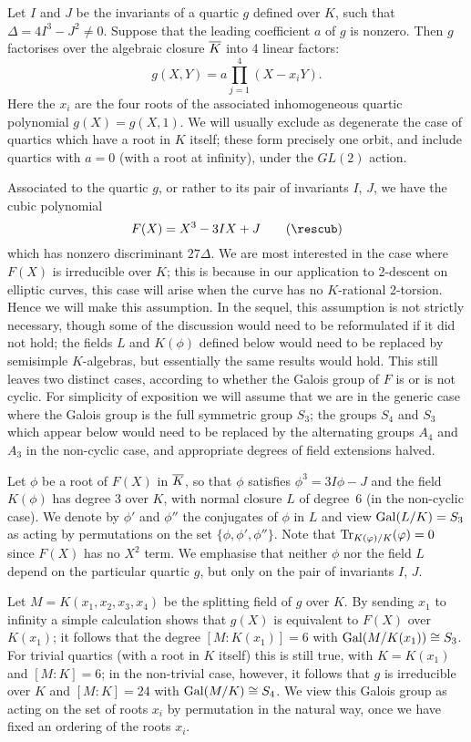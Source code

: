 Let $I$ and $J$ be the invariants of a quartic $g$ defined over
$K$, such that $\Delta=4I^3-J^2\not=0$.  Suppose that the leading
coefficient $a$ of $g$ is nonzero.  Then $g$ factorises over the
algebraic closure $\overline{K}$ into 4 linear factors:
$$
   g(X,Y) = a \prod_{j=1}^{4} (X-x_iY).
$$
Here the $x_i$ are the four roots of the associated inhomogeneous
quartic polynomial $g(X)=g(X,1)$.   We will usually exclude as
degenerate the case of quartics which have a root in $K$ itself; these
form precisely one orbit, and include quartics with $a=0$ (with a root
at infinity), under the $GL(2)$ action.

Associated to the quartic $g$, or rather to its pair of invariants
$I$, $J$, we have the cubic polynomial \neweq\rescub
$$
  F(X) = X^3 - 3IX + J \tag\rescub
$$
which has nonzero discriminant $27\Delta$.  We are most interested in
the case where $F(X)$ is irreducible over $K$; this is because in our
application to 2-descent on elliptic curves, this case will arise when
the curve has no $K$-rational 2-torsion.  Hence we will make this
assumption.  In the sequel, this assumption is not strictly necessary,
though some of the discussion would need to be reformulated if it did
not hold; the fields $L$ and $K(\phi)$ defined below would need to be
replaced by semisimple $K$-algebras, but essentially the same results
would hold.  This still leaves two distinct cases, according to
whether the Galois group of $F$ is or is not cyclic.  For simplicity
of exposition we will assume that we are in the generic case where the
Galois group is the full symmetric group $S_3$; the groups $S_4$ and
$S_3$ which appear below would need to be replaced by the alternating
groups $A_4$ and $A_3$ in the non-cyclic case, and appropriate degrees
of field extensions halved.

Let $\phi$ be a root of $F(X)$ in $\overline{K}$, so that $\phi$ satisfies
$\phi^3=3I\phi-J$ and the field $K(\phi)$ has degree 3 over $K$, with
normal closure $L$ of degree~6 (in the non-cyclic case).  We denote by
$\phi'$ and $\phi''$ the conjugates of $\phi$ in $L$ and view
$\operatorname{Gal}(L/K)=S_3$ as acting by permutations on the set
$\{\phi,\phi',\phi''\}$.  Note that $\operatorname{Tr}_{K(\varphi)/K}(\varphi)=0$ since
$F(X)$ has no $X^2$ term.  We emphasise that neither $\phi$ nor the
field $L$ depend on the particular quartic $g$, but only on the pair
of invariants $I$, $J$.

Let $M=K(x_1,x_2,x_3,x_4)$ be the splitting field of $g$ over $K$.  By
sending $x_1$ to infinity a simple calculation shows that 
$g(X)$ is equivalent to $F(X)$ over
$K(x_1)$; it follows that the degree
$[M:K(x_1)]=6$ with $\operatorname{Gal}(M/K(x_1))\cong S_3$.   For trivial quartics
(with a root in $K$ itself) this is still true, with $K=K(x_1)$ and
$[M:K]=6$; in the non-trivial case, however, it follows that $g$ is
irreducible over $K$ and $[M:K]=24$ with $\operatorname{Gal}(M/K)\cong S_4$.  We
view this Galois group as acting on the set of roots $x_i$ by
permutation in the natural way, once we have fixed an ordering of the
roots $x_i$.

